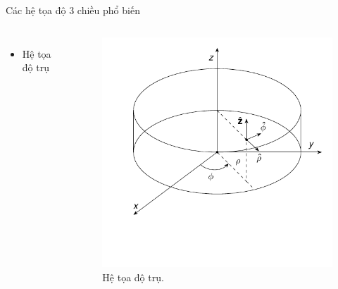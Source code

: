 \begin{frame}{Các hệ tọa độ 3 chiều phổ biến}
\begin{columns}
        \begin{itemize}
            \item Hệ tọa độ trụ
        \end{itemize}
        \begin{figure}
            \centering
            \includegraphics[width=\linewidth]{Figures/Cylindrical_coordinates.pdf}
            \caption{Hệ tọa độ trụ.}
            \label{fig:Cylindrical_coordinates}
        \end{figure}


\end{columns}
\end{frame}
